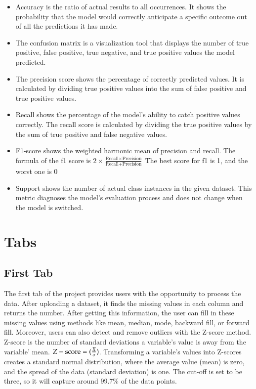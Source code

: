 \documentclass[a4paper,twocolumn,12pt]{article}
\begin{document}
\begin{itemize}

    \item Accuracy is the ratio of actual results to all occurrences. It shows the probability that the model would correctly anticipate a specific outcome out of all the predictions it has made. 
    \item The confusion matrix is a visualization tool that displays the number of true positive, false positive, true negative, and true positive values the model predicted.
    \item The precision score shows the percentage of correctly predicted values. It is calculated by dividing true positive values into the sum of false positive and true positive values. 
    \item Recall shows the percentage of the model's ability to catch positive values correctly. The recall score is calculated by dividing the true positive values by the sum of true positive and false negative values. 
    \item F1-score shows the weighted harmonic mean of precision and recall. The formula of the f1 score is \(2 \times \frac{\text{Recall} \times \text{Precision}}{\text{Recall}+ \text{Precision}}\) The best score for f1 is 1, and the worst one is 0
    \item Support shows the number of actual class instances in the given dataset. This metric diagnoses the model's evaluation process and does not change when the model is switched.\cite{related_work}

\end{itemize}

\section{Tabs}
\subsection{First Tab}

The first tab of the project provides users with the opportunity to process the data. After uploading a dataset, it finds the missing values in each column and returns the number. After getting this information, the user can fill in these missing values using methods like mean, median, mode, backward fill, or forward fill. Moreover, users can also detect and remove outliers with the Z-score method. Z-score is the number of standard deviations a variable's value is away from the variable' mean. \(Z-\text{score} = (\frac{\Bar{X}}{\sigma})\). Transforming a variable's values into Z-scores creates a standard normal distribution, where the average value (mean) is zero, and the spread of the data (standard deviation) is one.\cite{boxplot-outlier} The cut-off is set to be three, so it will capture around 99.7\% of the data points. 
\end{document}
